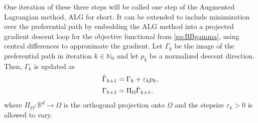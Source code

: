 \documentclass{article}
\def\R{{\mathbb R}}
\begin{document}
One iteration of these three steps will be called one step of the Augmented Lagrangian method, ALG for short. 
It can be extended to include minimization over the preferential path by embedding the ALG method into a projected gradient descent loop for the objective functional from \eqref{eq:BBgamma}, using central differences to approximate the gradient. 
Let $\Gamma_k$ be the image of the preferential path in iteration $k\in\mathbb{N}_0$ and let $p_k$ be a normalized descent direction. Then, $\Gamma_k$ is updated as
\begin{align*}
    \Tilde{\Gamma}_{k+1} &= \Gamma_k + \varepsilon_k p_k, \\
    \Gamma_{k+1} &= \Pi_\Omega \Tilde{\Gamma}_{k+1},
\end{align*}
where $\Pi_\Omega: \R^d \to \Omega$ is the orthogonal projection onto $\Omega$ and the stepsize $\varepsilon_k>0$ is allowed to vary. 
\end{document}
